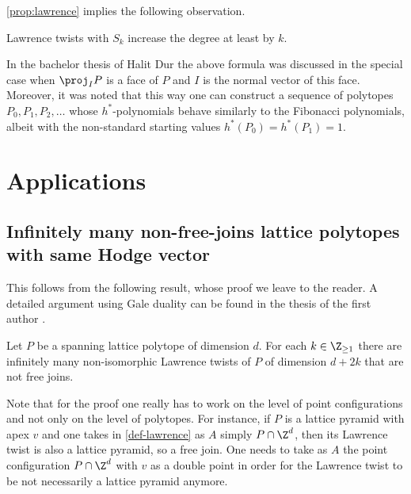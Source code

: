 \documentclass[reqno, 11pt, a4paper, oneside]{amsart}
\begin{document}
\cref{prop:lawrence} implies the following observation.

\begin{cor}
Lawrence twists with $S_k$ increase the degree at least by $k$.
\label{cor-degree}
\end{cor}


\begin{rem}
In the bachelor thesis of Halit Dur \cite{Halit_Dur} the above formula was discussed in the special case when $\proj_I P$ is a face of $P$ and $I$ is the normal vector of this face. Moreover, it was noted that this way one can construct a sequence of polytopes $P_0,P_1,P_2, \ldots$ whose $h^*$-polynomials behave similarly to the Fibonacci polynomials, albeit with the non-standard starting values $h^*(P_0)=h^*(P_1)=1$. 
\end{rem}


\section{Applications}
\label{sec:applications}

\subsection{Infinitely many non-free-joins lattice polytopes with same Hodge vector}

This follows from the following result, whose proof
we leave to the reader. A detailed argument using Gale duality can be found in the thesis of the first author \cite[Lemma 13]{vadym_thesis}.

\begin{lem}
 Let $P$ be a spanning lattice polytope of dimension $d$. For each $k \in \Z_{\ge 1}$ there are infinitely many non-isomorphic Lawrence twists of $P$ of dimension $d+2k$ that are not free joins. \label{lem-lawrence}
\end{lem}

\begin{rem}
Note that for the proof one really has to work on the level of point configurations and not only on the level of polytopes. For instance, if $P$ is a lattice pyramid with apex $v$ and one takes in \cref{def-lawrence} as $A$ simply $P \cap \Z^d$, then its Lawrence twist is also a lattice pyramid, so a free join. One needs to take as $A$ the point configuration $P \cap \Z^d$ with $v$ as a double point in order for the Lawrence twist to be not necessarily a lattice pyramid anymore. 
\end{rem}
\end{document}
